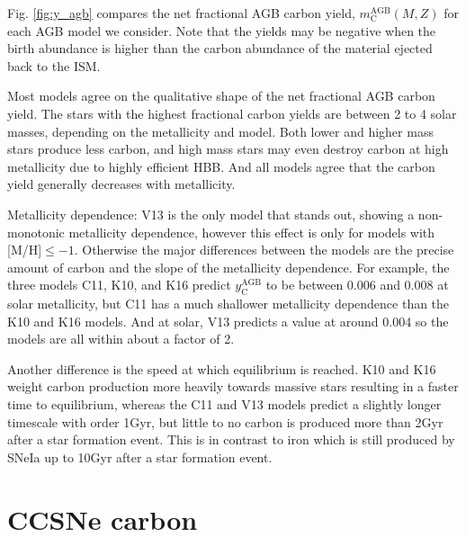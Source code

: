 \documentclass[12pt,oneside]{report}
\begin{document}
Fig. \ref{fig:y_agb} compares the net fractional AGB carbon yield, $m_\text{C}^\text{AGB}(M, Z)$ for each AGB model we consider. Note that the yields may be negative when the birth abundance is higher than the carbon abundance of the material ejected back to the ISM. 

Most models agree on the qualitative shape of the net fractional AGB carbon yield. The stars with the highest fractional carbon yields are between 2 to 4 solar masses, depending on the metallicity and model. Both lower and higher mass stars produce less carbon, and high mass stars may even destroy carbon at high metallicity due to highly efficient HBB. And all models agree that the carbon yield generally decreases with metallicity. 


Metallicity dependence:
V13 is the only model that stands out, showing a non-monotonic metallicity dependence, however this effect is only for models with [M/H]$\leq -1$. Otherwise the major differences between the models are the precise amount of carbon and the slope of the metallicity dependence. For example, the three models C11, K10, and K16 predict $y_\text{C}^\text{AGB}$ to be between 0.006 and 0.008 at solar metallicity, but C11 has a much shallower metallicity dependence than the K10 and K16 models. And at solar, V13 predicts a value at around 0.004 so the models are all within about a factor of 2. 

Another difference is the speed at which equilibrium is reached. K10 and K16 weight carbon production more heavily towards massive stars resulting in a faster time to equilibrium, whereas the C11 and V13 models predict a slightly longer timescale with order 1Gyr, but little to no carbon is produced more than 2Gyr after a star formation event. This is in contrast to iron which is still produced by SNeIa up to 10Gyr after a star formation event. 


\section{CCSNe carbon}
\end{document}
